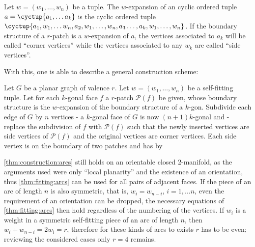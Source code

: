 \begin{definition}
  Let $w = (w_1, \dots, w_n)$ be a tuple. The $w$-expansion of an cyclic ordered tuple $a = \cyctup{a_1, \dots a_k}$ is the cyclic ordered tuple $\cyctup{a_1, w_1, \dots w_n, a_2, w_1, \dots, w_n, a_3 \dots, a_k, w_1, \dots, w_n}$. If the boundary structure of a $r$-patch is a $w$-expansion of $a$, the vertices associated to $a_k$ will be called ``corner vertices'' while the vertices associated to any $w_k$ are called ``side vertices''.
\end{definition}

With this, one is able to describe a general construction scheme:

\begin{construction}\label{thm:construction:patch} Let $G$ be a planar graph of valence $r$. Let $w = (w_1, \dots, w_n)$ be a self-fitting tuple. Let for each $k$-gonal face $f$ a $r$-patch $\mathcal{P}(f)$ be given, whose boundary structure is the $w$-expansion of the boundary structure of a $k$-gon. Subdivide each edge of $G$ by $n$ vertices - a $k$-gonal face of $G$ is now  $(n+1)k$-gonal and - replace the subdivision of $f$ with $\mathcal{P}(f)$ such that the newly inserted vertices are side vertices of $\mathcal{P}(f)$ and the original vertices are corner vertices. Each side vertex is on the boundary of two patches and has by \label{thm:fitting:arcs}
\end{construction}

\begin{remark}
  \autoref{thm:construction:arcs} still holds on an orientable closed $2$-manifold, as the arguments used were only ``local planarity'' and the existence of an orientation, thus \autoref{thm:fitting:arcs} can be used for all pairs of adjacent faces. If the piece of an arc of length $n$ is also symmetric, that is, $w_i = w_{n-i}$, $i = 1, \dots n$, even the requirement of an orientation can be dropped, the necessary equations of \autoref{thm:fitting:arcs} then hold regardless of the numbering of the vertices. If $w_i$ is a weight in a symmetric self-fitting piece of an arc of length $n$, then $w_i + w_{n-i} = 2 w_i = r$, therefore for these kinds of arcs to exists $r$ has to be even; reviewing the considered cases only $r = 4$ remains.
\end{remark}

